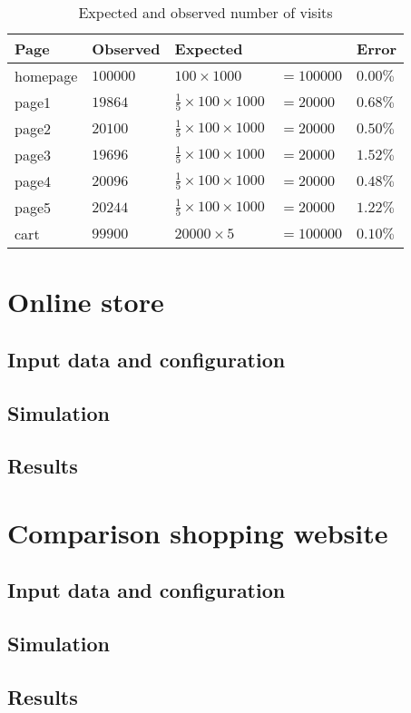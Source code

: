 \begin{table}[]
    \centering
    \caption{Expected and observed number of visits}
    \label{tab:test2results}
    \begin{tabular}{@{}lllll@{}}
        \toprule
        Page     & Observed   & \multicolumn{2}{l}{Expected} & Error  \\ 
        \midrule
        homepage & $100000$   & $100 \times 1000$ & $ = 100000$      & $0.00\%$ 
        \\
        page1    & $19864$    & $\frac{1}{5} \times 100 \times 1000$ & $ = 
        20000$ &         $0.68\%$ \\
        page2    & $20100$    & $\frac{1}{5} \times 100 \times 1000$ & $ = 
        20000$ &         $0.50\%$ \\
        page3    & $19696$    & $\frac{1}{5} \times 100 \times 1000$ & $ = 
        20000$ &         $1.52\%$ \\
        page4    & $20096$    & $\frac{1}{5} \times 100 \times 1000$ & $ = 
        20000$ &         $0.48\%$ \\
        page5    & $20244$    & $\frac{1}{5} \times 100 \times 1000$ & $ = 
        20000$ &         $1.22\%$ \\
        cart     & $99900$    & $20000 \times 5$ & $ = 100000$       & $0.10\%$ 
        \\ 
        \bottomrule
    \end{tabular}
\end{table}

\section{Online store}

\subsection{Input data and configuration}
\subsection{Simulation}
\subsection{Results}

\section{Comparison shopping website}

\subsection{Input data and configuration}
\subsection{Simulation}
\subsection{Results}
